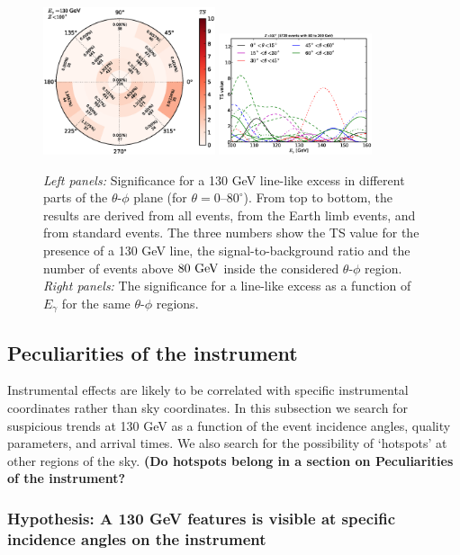 \documentclass[aps,twocolumn,prd,superscriptaddress,showpacs,nofootinbib,fixfloat]{revtex4}
\newcommand{\GeV}{{\rm ~GeV}}
\begin{document}
\begin{figure}
  \includegraphics[width=0.45\textwidth]{plots/polar_z.LE.100.eps}
  \includegraphics[width=0.40\textwidth]{plots/scan_z.LE.100.eps}
  \caption{\emph{Left panels:} Significance for a 130 GeV
  line-like excess in different parts of the $\theta$-$\phi$
  plane (for $\theta=0$--$80^\circ$). From top to bottom,
  the results are derived from all events, from the Earth
  limb events, and from standard events. The three numbers
  show the TS value for the presence of a 130 GeV line, the
  signal-to-background ratio and the number of events above
  $80\GeV$ inside the considered $\theta$-$\phi$ region.
  \emph{Right panels:} The significance for a
  line-like excess as a function of $E_\gamma$ for the same $\theta$-$\phi$ regions.}
  \label{fig:polarPlotsAll}
\end{figure}


\subsection{Peculiarities of the instrument}
Instrumental effects are likely to be correlated with specific instrumental
coordinates rather than sky coordinates. In this subsection we search for
suspicious trends at 130 GeV as a function of the event incidence angles,
quality parameters, and arrival times.  We also search for the possibility of
`hotspots' at other regions of the sky.   {\bf (Do hotspots belong in a
  section on Peculiarities of the instrument? }

\subsubsection{Hypothesis: A 130 GeV features is visible
at specific incidence angles on the instrument}
\end{document}
